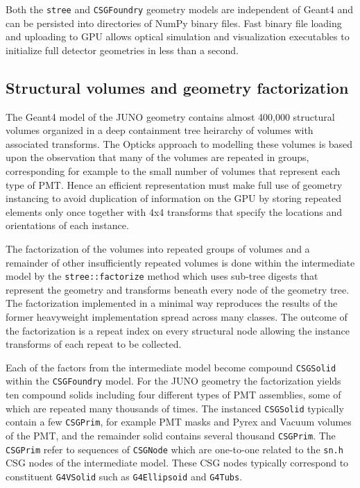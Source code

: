 \documentclass{webofc}
\begin{document}
Both the {\tt stree} and {\tt CSGFoundry} geometry models are independent of Geant4 and can be persisted into directories of NumPy\cite{numpy} binary files. 
Fast binary file loading and uploading to GPU allows optical simulation and visualization
executables to initialize full detector geometries in less than a second.  
%
\subsection{Structural volumes and geometry factorization}%
%
The Geant4 model of the JUNO geometry contains almost 400,000 structural volumes organized in a deep containment tree
heirarchy of volumes with associated transforms.
The Opticks approach to modelling these volumes is based upon the observation that many of the
volumes are repeated in groups, corresponding for example to the small number of volumes that represent each type of PMT.
Hence an efficient representation must make full use of geometry instancing to avoid duplication of information 
on the GPU by storing repeated elements only once together with 4x4 transforms
that specify the locations and orientations of each instance.

The factorization of the volumes into repeated groups of volumes and a remainder of 
other insufficiently repeated volumes is done within the intermediate model by the 
{\tt stree::factorize} method which uses sub-tree digests that represent the geometry and transforms 
beneath every node of the geometry tree. The factorization implemented in a minimal way 
reproduces the results of the former heavyweight implementation spread across many classes. 
The outcome of the factorization is a repeat index on every structural node allowing 
the instance transforms of each repeat to be collected. 

Each of the factors from the intermediate model become 
compound {\tt CSGSolid} within the {\tt CSGFoundry} model.  
For the JUNO geometry the factorization yields ten compound solids including four 
different types of PMT assemblies, some of which are repeated many thousands of times. 
The instanced {\tt CSGSolid} typically contain a few {\tt CSGPrim}, for example PMT masks and Pyrex and Vacuum volumes of the PMT,
and the remainder solid contains several thousand {\tt CSGPrim}. 
The {\tt CSGPrim} refer to sequences of {\tt CSGNode} which are one-to-one related to the {\tt sn.h} CSG nodes
of the intermediate model. These CSG nodes typically correspond to constituent {\tt G4VSolid} such as {\tt G4Ellipsoid} and {\tt G4Tubs}. 
%
%
\end{document}
